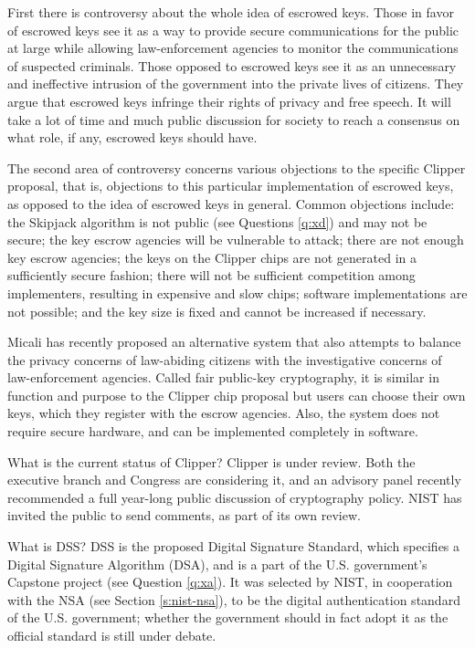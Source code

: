 First there is controversy about the whole idea of escrowed keys.
Those in favor of escrowed keys see it as a way to provide secure 
communications for the public at large while allowing law-enforcement 
agencies to monitor the communications of suspected criminals. Those
opposed to escrowed keys see it as an unnecessary and ineffective
intrusion of the government into the private lives of citizens. They
argue that escrowed keys infringe their rights of privacy and free
speech. It will take a lot of time and much public discussion for society
to reach a consensus on what role, if any, escrowed keys should have.

The second area of controversy concerns various objections to the
specific Clipper proposal, that is, objections to this particular
implementation of escrowed keys, as opposed to the idea of escrowed
keys in general. Common objections include: the Skipjack algorithm
is not public (see Questions \ref{q:xd}) and may not be secure; the
key escrow agencies will be vulnerable to attack; there are not enough
key escrow agencies; the keys on the Clipper chips are not generated
in a sufficiently secure fashion; there will not be sufficient 
competition among implementers, resulting in expensive and slow chips;
software implementations are not possible; and the key size is fixed
and cannot be increased if necessary.

Micali \cite{micali0} has recently proposed an alternative system that 
also attempts to balance the privacy concerns of law-abiding citizens 
with the investigative concerns of law-enforcement agencies. Called fair 
public-key cryptography, it is similar in function and purpose to the 
Clipper chip proposal but users can choose their own keys, which they 
register with the escrow agencies. Also, the system does not require 
secure hardware, and can be implemented completely in software.

{What is the current status of Clipper?}
Clipper is under review. Both the executive branch and Congress are
considering it, and an advisory panel recently recommended a full
year-long public discussion of cryptography policy. NIST has invited 
the public to send comments, as part of its own review.

{What is DSS?}
DSS is the proposed Digital Signature Standard, which specifies a 
Digital Signature Algorithm (DSA), and is a part of the U.S. government's
Capstone project (see Question \ref{q:xa}). It was selected by NIST, 
in cooperation with the NSA (see Section \ref{s:nist-nsa}), to be the 
digital authentication standard of the U.S. government; whether the 
government should in fact adopt it as the official standard is still 
under debate. 

